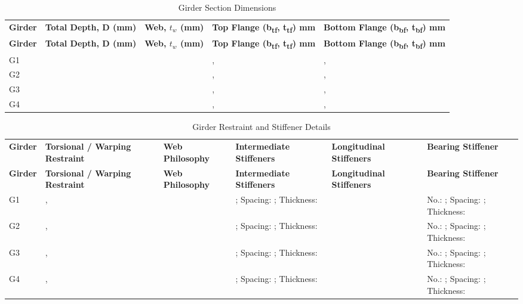 \documentclass[12pt,a4paper]{report}
\numberwithin{figure}{chapter}
\begin{document}
\vspace{4pt}
\begin{longtable}{|L{2.14cm}|L{2.29cm}|L{2.09cm}|L{3.34cm}|L{3.37cm}|}
\caption{Girder Section Dimensions}\\
\hline
\textbf{Girder} & \textbf{Total Depth, D (mm)} & \textbf{Web, $t_w$ (mm)} & \textbf{Top Flange (b\textsubscript{tf}, t\textsubscript{tf}) mm} & \textbf{Bottom Flange (b\textsubscript{bf}, t\textsubscript{bf}) mm} \\
\hline
\endfirsthead
\hline
\textbf{Girder} & \textbf{Total Depth, D (mm)} & \textbf{Web, $t_w$ (mm)} & \textbf{Top Flange (b\textsubscript{tf}, t\textsubscript{tf}) mm} & \textbf{Bottom Flange (b\textsubscript{bf}, t\textsubscript{bf}) mm} \\
\hline
\endhead
G1 &  &  & ,  & ,  \\
\hline
G2 &  &  & ,  & ,  \\
\hline
G3 &  &  & ,  & ,  \\
\hline
G4 &  &  & ,  & ,  \\
\hline
\end{longtable}

\vspace{0.6em}

\vspace{4pt}
\begin{longtable}{|L{1.77cm}|L{2.17cm}|L{2.07cm}|L{2.27cm}|L{2.27cm}|L{2.22cm}|}
\caption{Girder Restraint and Stiffener Details}\\
\hline
\textbf{Girder} & \textbf{Torsional / Warping Restraint} & \textbf{Web Philosophy} & \textbf{Intermediate Stiffeners} & \textbf{Longitudinal Stiffeners} & \textbf{Bearing Stiffener} \\
\hline
\endfirsthead
\hline
\textbf{Girder} & \textbf{Torsional / Warping Restraint} & \textbf{Web Philosophy} & \textbf{Intermediate Stiffeners} & \textbf{Longitudinal Stiffeners} & \textbf{Bearing Stiffener} \\
\hline
\endhead
G1 & ,  &  & ; Spacing: ; Thickness:  &  & No.: ; Spacing: ; Thickness:  \\
\hline
G2 & ,  &  & ; Spacing: ; Thickness:  &  & No.: ; Spacing: ; Thickness:  \\
\hline
G3 & ,  &  & ; Spacing: ; Thickness:  &  & No.: ; Spacing: ; Thickness:  \\
\hline
G4 & ,  &  & ; Spacing: ; Thickness:  &  & No.: ; Spacing: ; Thickness:  \\
\hline
\end{longtable}
\end{document}
